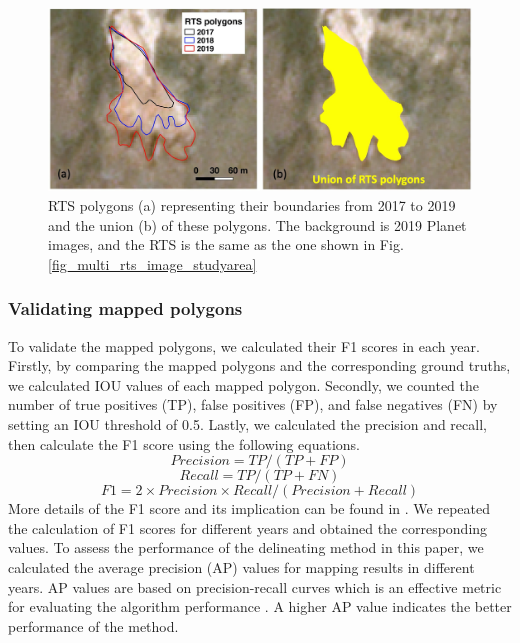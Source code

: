 \documentclass[authoryear,preprint,review,12pt]{elsarticle}
\begin{document}
\begin{figure} 
	\centering
	\includegraphics[width=14cm]{figs/rts_expanding_example_trim.jpg}
	\caption{RTS polygons (a) representing their boundaries from 2017 to 2019 and the union (b) of these polygons. The background is 2019 Planet images, and the RTS is the same as the one shown in Fig. \ref{fig_multi_rts_image_studyarea}}
	\label{fig_rts_expanding}
\end{figure}


\subsubsection{Validating mapped polygons}
\label{sec_validate_mapped_polygons}

To validate the mapped polygons, we calculated their F1 scores in each year. 
Firstly, by comparing the mapped polygons and the corresponding ground truths, we calculated IOU values of each mapped polygon. 
Secondly, we counted the number of true positives (TP), false positives (FP), and false negatives (FN) by setting an IOU threshold of 0.5.
Lastly, we calculated the precision and recall, then calculate the F1 score using the following equations. 
\begin{equation}
Precision=TP/(TP+FP)
\label{equ_precision}
\end{equation}
\begin{equation}
Recall=TP/(TP+FN)
\label{equ_recall}
\end{equation}
\begin{equation}
F1=2 \times Precision \times Recall / (Precision + Recall)
\label{equ_f1score}
\end{equation}
More details of the F1 score and its implication can be found in \cite{huang2020using}.
We repeated the calculation of F1 scores for different years and obtained the corresponding values. 
To assess the performance of the delineating method in this paper, we calculated the average precision (AP) values for mapping results in different years. %
AP values are based on precision-recall curves which is an effective metric for evaluating the algorithm performance \citep{huang2020using}.
A higher AP value indicates the better performance of the method. 
\end{document}

